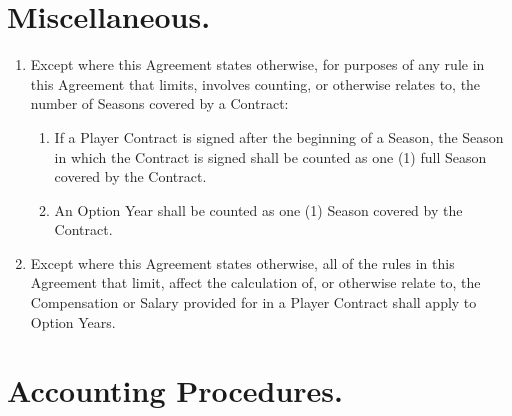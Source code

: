 \documentclass[
]{book}
\providecommand{\tightlist}{%
  \setlength{\itemsep}{0pt}\setlength{\parskip}{0pt}}
\begin{document}
\hypertarget{miscellaneous.}{%
\section{Miscellaneous.}\label{miscellaneous.}}

\begin{enumerate}
\def\labelenumi{(\alph{enumi})}
\tightlist
\item
  Except where this Agreement states otherwise, for purposes of any rule in this Agreement that limits, involves counting, or otherwise relates to, the number of Seasons covered by a Contract:

  \begin{enumerate}
  \def\labelenumii{(\arabic{enumii})}
  \tightlist
  \item
    If a Player Contract is signed after the beginning of a Season, the Season in which the Contract is signed shall be counted as one (1) full Season covered by the Contract.
  \item
    An Option Year shall be counted as one (1) Season covered by the Contract.
  \end{enumerate}
\item
  Except where this Agreement states otherwise, all of the rules in this Agreement that limit, affect the calculation of, or otherwise relate to, the Compensation or Salary provided for in a Player Contract shall apply to Option Years.
\end{enumerate}

\hypertarget{accounting-procedures.}{%
\section{Accounting Procedures.}\label{accounting-procedures.}}
\end{document}
